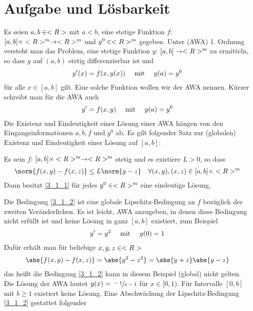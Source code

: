 \section{Aufgabe und Lösbarkeit}

Es seien $a,b \in \R$ mit $a < b$, eine stetige Funktion $f$: $[a,b] \times \R^m \to \R^m$ und $y^0 \in \R^m$ gegeben. Unter  (AWA) 1. Ordnung versteht man das Problem, eine stetige Funktion $y$: $[a,b] \to \R^m$ zu ermitteln, so dass $y$ auf $(a,b)$ stetig differenzierbar ist und
\begin{align}
	y'(x) = f(x,y(x)) \quad \mit \quad y(a)=y^0 \notag
\end{align}
für alle $x \in [a,b]$ gilt. Eine solche Funktion wollen wir  der AWA nennen. Kürzer schreibt man für die AWA auch
\begin{align}
	\label{3_1_1}
	y'=f(x,y) \quad \mit \quad y(a)=y^0
\end{align}
Die Existenz und Eindeutigkeit einer Lösung einer AWA hängen von den Eingangsinformationen $a,b,f$ und $y^0$ ab. Es gilt folgender Satz zur (globalen) Existenz und Eindeutigkeit einer Lösung auf $[a,b]$:

\begin{proposition}
	Es sein $f$: $[a,b] \times \R^m \to \R^m$ stetig und es existiere $L>0$, so dass
	\begin{align}
		\label{3_1_2}
		\norm{f(x,y)-f(x,z)} \le L \norm{y-z} \quad \forall (x,y),(x,z) \in [a,b] \times \R^m
	\end{align}
	Dann besitzt \cref{3_1_1} für jedes $y^0 \in \R^m$ eine eindeutige Lösung.
\end{proposition}

Die Bedingung \cref{3_1_2} ist eine globale Lipschitz-Bedingung an $f$ bezüglich der zweiten Veränderlichen. Es ist leicht, AWA anzugeben, in denen diese Bedingung nicht erfüllt ist und keine Lösung in ganz $[a,b]$ existiert, zum Beispiel
\begin{align}
	y'= y^2 \quad \mit \quad y(0) = 1 \notag
\end{align}
Dafür erhält man für beliebige $x,y,z \in \R$
\begin{align}
	\abs{f(x,y) - f(x,z)} = \abs{y^2 - z^2} = \abs{y+z} \abs{y-z} \notag
\end{align}
das heißt die Bedingung \cref{3_1_2} kann in diesem Beispiel (global) nicht gelten. Die Lösung der AWA lautet $y(x) = \sfrac{-1}{x-1}$ für $x \in [0,1)$. Für Intervalle $[0,b]$ mit $b \ge 1$ existiert keine Lösung. Eine Abschwächung der Lipschitz-Bedingung \cref{3_1_2} gestattet folgender

